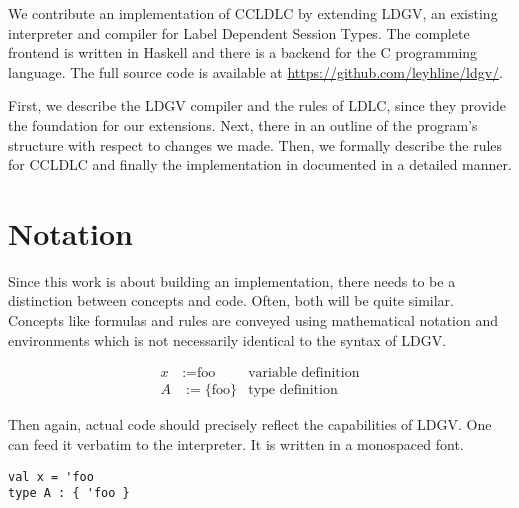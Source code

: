We contribute an implementation of CCLDLC by extending LDGV, an existing interpreter and compiler for Label Dependent Session Types. The complete frontend is written in Haskell and there is a backend for the C programming language. The full source code is available at \url{https://github.com/leyhline/ldgv/}. 

First, we describe the LDGV compiler and the rules of LDLC, since they provide the foundation for our extensions. Next, there in an outline of the program's structure with respect to changes we made. Then, we formally describe the rules for CCLDLC and finally the implementation in documented in a detailed manner.

\section{Notation}

Since this work is about building an implementation, there needs to be a distinction between concepts and code. Often, both will be quite similar. Concepts like formulas and rules are conveyed using mathematical notation and environments which is not necessarily identical to the syntax of LDGV.

\begin{align*}
 x &:= \text{foo} & \text{variable definition} \\
 A &:= \{ \text{foo} \} & \text{type definition}
\end{align*}

Then again, actual code should precisely reflect the capabilities of LDGV. One can feed it verbatim to the interpreter. It is written in a monospaced font.

\begin{lstlisting}[language=ldgv,caption=Code listing example]
val x = 'foo
type A : { 'foo }
\end{lstlisting}
